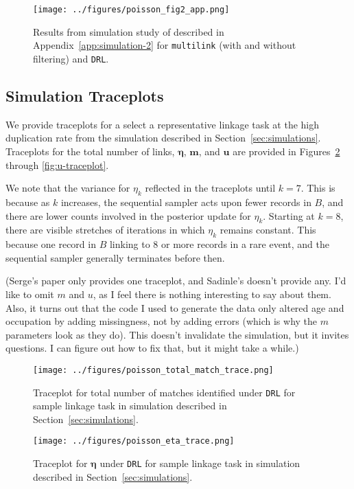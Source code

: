 \documentclass[12pt,letterpaper]{article}
\newcommand{\1}[1]{\mathbb{I}\!\left[#1\right]} %
\def \brian#1{{\color{red} (#1)}}
\begin{document}
\begin{figure}
	\centering
	\texttt{[image: ../figures/poisson\_fig2\_app.png]}
	\caption{Results from simulation study of described in Appendix~\ref{app:simulation-2} for \texttt{multilink} (with and without filtering) and \texttt{DRL}.}
	\label{fig:sim-multilink-comparison-2}
\end{figure}

\subsection{Simulation Traceplots}\label{app:simulation-traceplots}

We provide traceplots for a select a representative linkage task at the high duplication rate from the simulation described in Section~\ref{sec:simulations}. Traceplots for the total number of links, $\bm{\eta}$, $\bm{m}$, and $\bm{u}$ are provided in Figures~\ref{fig:total-match-traceplot} through \ref{fig:u-traceplot}.

We note that the variance for $\eta_k$ reflected in the traceplots until $k=7$. This is because as $k$ increases, the sequential sampler acts upon fewer records in $B$, and there are lower counts involved in the posterior update for $\eta_k$. Starting at $k=8$, there are visible stretches of iterations in which $\eta_k$ remains constant. This because one record in $B$ linking to 8 or more records in a rare event, and the sequential sampler generally terminates before then. 

\brian{Serge's paper only provides one traceplot, and Sadinle's doesn't provide any. I'd like to omit $m$ and $u$, as I feel there is nothing interesting to say about them. Also, it turns out that the code I used to generate the data only altered age and occupation by adding missingness, not by adding errors (which is why the $m$ parameters look as they do). This doesn't invalidate the simulation, but it invites questions. I can figure out how to fix that, but it might take a while.}

\begin{figure}[t]
	\centering
	\texttt{[image: ../figures/poisson\_total\_match\_trace.png]}
	\caption{Traceplot for total number of matches identified under \texttt{DRL} for sample linkage task in simulation described in Section~\ref{sec:simulations}.}
	\label{fig:total-match-traceplot}
\end{figure}

\begin{figure}[t]
	\centering
	\texttt{[image: ../figures/poisson\_eta\_trace.png]}
	\caption{Traceplot for $\bm{\eta}$ under \texttt{DRL} for sample linkage task in simulation described in Section~\ref{sec:simulations}.}
	\label{fig:eta-traceplot}
\end{figure}
\end{document}
